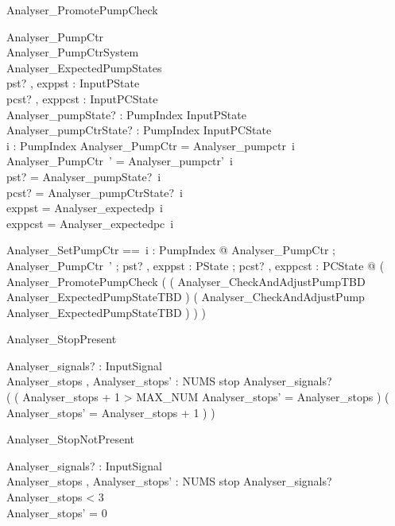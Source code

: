 \documentclass{article}
\begin{document}
\begin{schema}{Analyser\_PromotePumpCheck}

 \Delta Analyser\_PumpCtr \\
 \Delta Analyser\_PumpCtrSystem \\
 Analyser\_ExpectedPumpStates \\
 pst? , exppst : InputPState \\
 pcst? , exppcst : InputPCState \\
 Analyser\_pumpState? : PumpIndex \fun InputPState \\
 Analyser\_pumpCtrState? : PumpIndex \fun InputPCState \\
 i : PumpIndex 
\where
 \theta Analyser\_PumpCtr = Analyser\_pumpctr~i \\
 \theta Analyser\_PumpCtr~' = Analyser\_pumpctr'~i \\
 pst? = Analyser\_pumpState?~i \\
 pcst? = Analyser\_pumpCtrState?~i \\
 exppst = Analyser\_expectedp~i \\
 exppcst = Analyser\_expectedpc~i
\end{schema}

\begin{zed}
	Analyser\_SetPumpCtr ==~\forall i : PumpIndex @ \exists Analyser\_PumpCtr ; Analyser\_PumpCtr~' ; pst? , exppst : PState ; pcst? , exppcst : PCState @ ( Analyser\_PromotePumpCheck \land ( ( Analyser\_CheckAndAdjustPumpTBD \land Analyser\_ExpectedPumpStateTBD ) \lor ( Analyser\_CheckAndAdjustPump \land \lnot Analyser\_ExpectedPumpStateTBD ) ) )
\end{zed}

\begin{schema}{Analyser\_StopPresent}

 Analyser\_signals? : \power InputSignal \\
 Analyser\_stops , Analyser\_stops' : NUMS 
\where
 stop \in Analyser\_signals? \\
 ( ( Analyser\_stops + 1 > MAX\_NUM \land Analyser\_stops' = Analyser\_stops ) \lor ( Analyser\_stops' = Analyser\_stops + 1 ) )
\end{schema}

\begin{schema}{Analyser\_StopNotPresent}

 Analyser\_signals? : \power InputSignal \\
 Analyser\_stops , Analyser\_stops' : NUMS 
\where
 stop \notin Analyser\_signals? \land Analyser\_stops < 3 \\
 Analyser\_stops' = 0
\end{schema}
\end{document}
